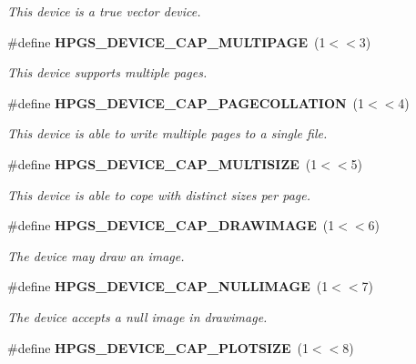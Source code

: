 \begin{DoxyCompactItemize}
\begin{DoxyCompactList}\small\item\em This device is a true vector device. \item\end{DoxyCompactList}\item 
\#define {\bf HPGS\_\-DEVICE\_\-CAP\_\-MULTIPAGE}~(1$<$$<$3)\label{group__device_gae56cf76d457f9ee8dd758b10d6bd10e5}

\begin{DoxyCompactList}\small\item\em This device supports multiple pages. \item\end{DoxyCompactList}\item 
\#define {\bf HPGS\_\-DEVICE\_\-CAP\_\-PAGECOLLATION}~(1$<$$<$4)\label{group__device_ga47c1e796774cc9019de505639ba2d8b4}

\begin{DoxyCompactList}\small\item\em This device is able to write multiple pages to a single file. \item\end{DoxyCompactList}\item 
\#define {\bf HPGS\_\-DEVICE\_\-CAP\_\-MULTISIZE}~(1$<$$<$5)\label{group__device_ga74b3043329761f6c48088374cb2645d0}

\begin{DoxyCompactList}\small\item\em This device is able to cope with distinct sizes per page. \item\end{DoxyCompactList}\item 
\#define {\bf HPGS\_\-DEVICE\_\-CAP\_\-DRAWIMAGE}~(1$<$$<$6)\label{group__device_ga0e8d3be8de1ccdc0c814a7d4f50d5ea5}

\begin{DoxyCompactList}\small\item\em The device may draw an image. \item\end{DoxyCompactList}\item 
\#define {\bf HPGS\_\-DEVICE\_\-CAP\_\-NULLIMAGE}~(1$<$$<$7)\label{group__device_ga137bf6ecfa0799889cc3338b3e6e57cf}

\begin{DoxyCompactList}\small\item\em The device accepts a null image in drawimage. \item\end{DoxyCompactList}\item 
\#define {\bf HPGS\_\-DEVICE\_\-CAP\_\-PLOTSIZE}~(1$<$$<$8)\label{group__device_ga6fc3e52dd7ac9e001d1148b075d16e4c}


\end{DoxyCompactItemize}
